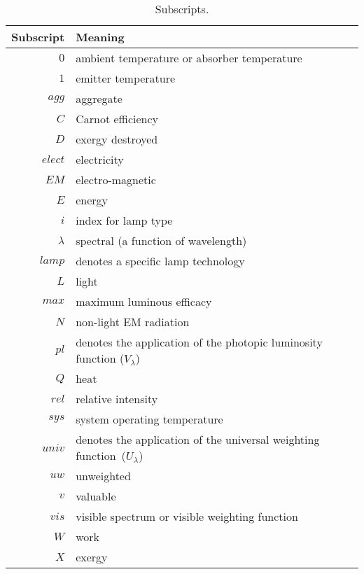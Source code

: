 \begin{table}
\centering
\caption{Subscripts.}
\begin{tabular}{r l}
\toprule
Subscript & Meaning \\
\midrule
$0$ & ambient temperature or absorber temperature \\
$1$ & emitter temperature \\
$agg$ & aggregate \\
$C$ & Carnot efficiency \\
$D$ & exergy destroyed \\
$elect$ & electricity \\
$EM$ & electro-magnetic \\
$E$ & energy \\
$i$ & index for lamp type \\
$\lambda$ & spectral (a function of wavelength) \\
$lamp$ & denotes a specific lamp technology \\
$L$ & light \\
$max$ & maximum luminous efficacy \\
$N$ & non-light EM radiation \\
$pl$ & denotes the application of the photopic luminosity function ($V_{\lambda}$) \\
$Q$ & heat \\
$rel$ & relative intensity \\
$sys$ & system operating temperature \\
$univ$ & denotes the application of the universal weighting function~($U_\lambda$) \\
$uw$ & unweighted \\
$v$ & valuable \\
$vis$ & visible spectrum or visible weighting function \\
$W$ & work \\
$X$ & exergy \\
\bottomrule
\end{tabular}
\label{tab:subscripts}
\end{table}


